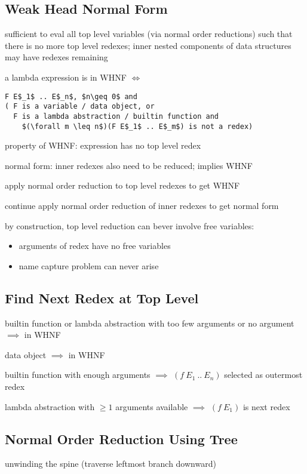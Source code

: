 \documentclass[8pt]{extarticle}
\begin{document}
\begin{multicols*}{2}
\subsection{Weak Head Normal Form}

sufficient to eval all top level variables (via normal order reductions) such that there is no more top level redexes; inner nested components of data structures may have redexes remaining

a lambda expression is in WHNF $\iff$
\begin{lstlisting}
F E$_1$ .. E$_n$, $n\geq 0$ and
( F is a variable / data object, or
  F is a lambda abstraction / builtin function and
    $(\forall m \leq n$)(F E$_1$ .. E$_m$) is not a redex)
\end{lstlisting}

property of WHNF: expression has no top level redex

normal form: inner redexes also need to be reduced; implies WHNF

apply normal order reduction to top level redexes to get WHNF

continue apply normal order reduction of inner redexes to get normal form

by construction, top level reduction can bever involve free variables:
\begin{itemize}
\item arguments of redex have no free variables
\item name capture problem can never arise
\end{itemize}

\subsection{Find Next Redex at Top Level}
builtin function or lambda abstraction with too few arguments or no argument $\implies$ in WHNF

data object $\implies$ in WHNF

builtin function with enough arguments $\implies$ $(f\ E_1\ ..\ E_n)$ selected as outermost redex

lambda abstraction with $\geq 1$ arguments available $\implies$ $(f\ E_1)$ is next redex

\subsection{Normal Order Reduction Using Tree}
unwinding the spine (traverse leftmost branch downward)


\end{multicols*}
\end{document}
